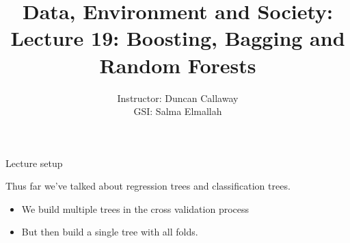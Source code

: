 \documentclass[mathserif, aspectratio=169]{beamer}
\title[Lecture 19] %
{Data, Environment and Society: \\{Lecture 19: Boosting, Bagging and Random Forests}}
\author[ER131: Data, Environment and Society] 
{Instructor: Duncan Callaway\\
GSI: Salma Elmallah}
\institute[UC Berkeley] %
 {\small{ \bf November 5, 2019}}
\date[November 5, 2019]
\begin{document}
\frame{
  \titlepage
}

\begin{frame}{Lecture setup}

Thus far we've talked about regression trees and classification trees.
\begin{itemize}
\item We build multiple trees in the cross validation process
\item But then build a single tree with all folds.
\end{itemize}



\end{frame}
\end{document}
